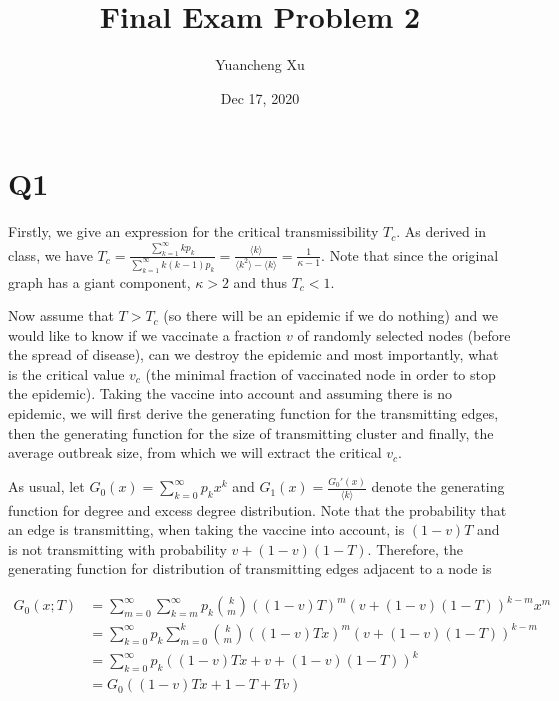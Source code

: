 \documentclass{article}
\title{Final Exam Problem 2 }
\author{Yuancheng Xu}
\date{Dec 17, 2020}
\begin{document}
\maketitle


\section*{Q1}
Firstly, we give an expression for the critical transmissibility $ T_c $. As derived in class, we have $ T_c =  \frac{\sum_{k=1}^{\infty}kp_k}{\sum_{k=1}^{\infty}k(k-1)p_k} = \frac{\langle k \rangle}{\langle k^2 \rangle - \langle k \rangle} = \frac{1}{\kappa - 1}$. Note that since the original graph has a giant component, $ \kappa > 2 $ and thus $ T_c <1 $.

Now assume that $ T > T_c $ (so there will be an epidemic if we do nothing) and we would like to know  if we vaccinate a fraction $ v $ of randomly selected nodes (before the spread of disease), can we destroy the epidemic and most importantly, what is the critical value $ v_c $ (the minimal fraction of vaccinated node in order to stop the epidemic). Taking the vaccine into account and assuming there is no epidemic, we will first derive the generating function for the transmitting edges, then the generating function for the size of transmitting cluster and finally, the average outbreak size, from which we will extract the critical $ v_c $.

As usual, let $ G_0(x) = \sum_{k=0}^{\infty}p_k x^k $ and $ G_1(x) =\frac{G_0'(x)}{\langle k \rangle} $ denote the generating function for degree and excess degree distribution. Note that the probability that an edge is transmitting, when taking the vaccine into account, is $ (1-v)T $ and is not transmitting with probability $ v + (1-v)(1-T) $. Therefore, the generating function for distribution of transmitting edges adjacent to a node is 

\begin{equation}\label{G_0}
	\begin{aligned}
		G_0(x;T) & = \sum_{m=0}^{\infty}\sum_{k=m}^{\infty}p_k \binom{k}{m}((1-v)T)^m (v+(1-v)(1-T))^{k-m}x^m \\
		& = \sum_{k=0}^{\infty}p_k\sum_{m=0}^{k} \binom{k}{m}((1-v)Tx)^m (v+(1-v)(1-T))^{k-m}\\
		& = \sum_{k=0}^{\infty}p_k ((1-v)Tx + v+(1-v)(1-T) )^k \\ 
		& = G_0((1-v)Tx + 1 - T + Tv)
	\end{aligned}
\end{equation}
\end{document}
